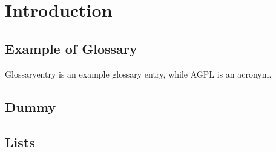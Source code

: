 
\chapter{Introduction}
\label{cha:Introduction}


\section{Example of Glossary}
\label{sec:ExGlossary}

\gls{Glossaryentry} is an example glossary entry, while \gls{AGPL} is an acronym.

\blindtext[5] \autocite{Testautor2002}

\section{Dummy}
\label{sec:Dummy}

\blindtext[2] \autocite{Author2013}

\section{Lists}
\label{sec:Lists}

\blindtext

\blinditemize[5]

\blindtext[2]